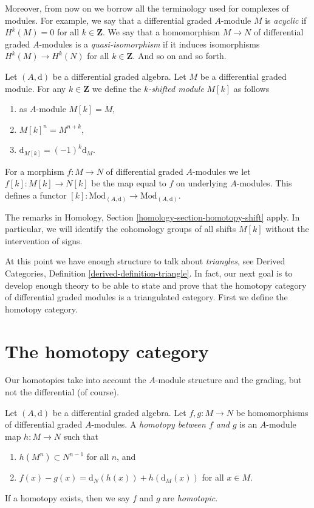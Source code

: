 \medskip\noindent
Moreover, from now on we borrow all the terminology used for
complexes of modules. For example, we say that a differential
graded $A$-module $M$ is {\it acyclic} if $H^k(M) = 0$ for
all $k \in \mathbf{Z}$. We say that a homomorphism $M \to N$
of differential graded $A$-modules is a {\it quasi-isomorphism}
if it induces isomorphisms $H^k(M) \to H^k(N)$ for all $k \in \mathbf{Z}$.
And so on and so forth.

\begin{definition}
\label{definition-shift}
Let $(A, \text{d})$ be a differential graded algebra.
Let $M$ be a differential graded module.
For any $k \in \mathbf{Z}$ we define the {\it $k$-shifted module}
$M[k]$ as follows
\begin{enumerate}
\item as $A$-module $M[k] = M$,
\item $M[k]^n = M^{n + k}$,
\item $\text{d}_{M[k]} = (-1)^k\text{d}_M$.
\end{enumerate}
For a morphism $f : M \to N$ of differential graded $A$-modules
we let $f[k] : M[k] \to N[k]$ be the map equal to $f$ on underlying
$A$-modules. This defines a functor
$[k] : \text{Mod}_{(A, \text{d})} \to \text{Mod}_{(A, \text{d})}$.
\end{definition}

\noindent
The remarks in Homology, Section \ref{homology-section-homotopy-shift} apply.
In particular, we will identify the cohomology groups of all shifts
$M[k]$ without the intervention of signs.

\medskip\noindent
At this point we have enough structure to talk about {\it triangles},
see Derived Categories, Definition \ref{derived-definition-triangle}.
In fact, our next goal is to develop enough theory to be able to
state and prove that the homotopy category of differential graded
modules is a triangulated category. First we define the homotopy category.






\section{The homotopy category}
\label{section-homotopy}

\noindent
Our homotopies take into account the $A$-module structure and the
grading, but not the differential (of course).

\begin{definition}
\label{definition-homotopy}
Let $(A, \text{d})$ be a differential graded algebra. Let
$f, g : M \to N$ be homomorphisms of differential graded $A$-modules.
A {\it homotopy between $f$ and $g$} is an $A$-module map $h : M \to N$
such that
\begin{enumerate}
\item $h(M^n) \subset N^{n - 1}$ for all $n$, and
\item $f(x) - g(x) = \text{d}_N(h(x)) + h(\text{d}_M(x))$ for
all $x \in M$.
\end{enumerate}
If a homotopy exists, then we say $f$ and $g$ are {\it homotopic}.
\end{definition}

